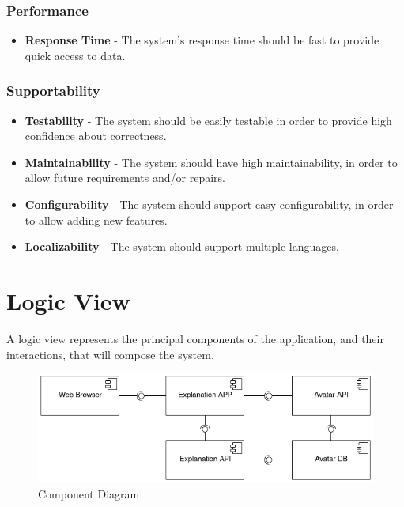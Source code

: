 \subsubsection{Performance}

\begin{itemize}
    \item \textbf{Response Time} - The system's response time should be fast to provide quick access to data.
\end{itemize}

\subsubsection{Supportability}

\begin{itemize}
    \item \textbf{Testability} - The system should be easily testable in order to provide high confidence about correctness.
    \item \textbf{Maintainability} - The system should have high maintainability, in order to allow future requirements and/or repairs.
    \item \textbf{Configurability} - The system should support easy configurability, in order to allow adding new features.
    \item \textbf{Localizability} - The system should support multiple languages.
\end{itemize}

\section{Logic View}

A logic view represents the principal components of the application, and their interactions, that will compose the system.

\begin{figure}[H]
\centering
\includegraphics[width=\textwidth,keepaspectratio]{ch4/assets/component_diagram.png}
\caption[Component Diagram]{Component Diagram}
\label{fig:cd}
\end{figure}

